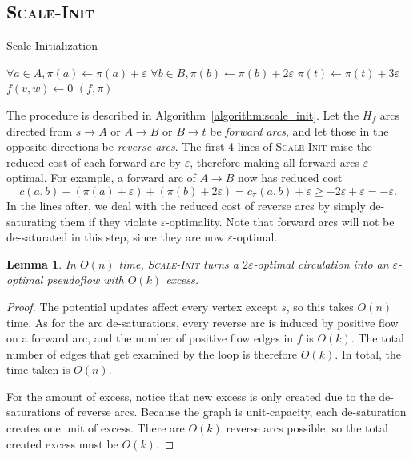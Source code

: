 \documentclass[11pt]{article}
\def\eps{\varepsilon}
\theoremstyle{plain}
\newtheorem{lemma}{Lemma}
\begin{document}
\subsection{\textsc{Scale-Init}}

\begin{algorithm}
\caption{Scale Initialization}
\label{algorithm:scale_init}
\begin{algorithmic}[1]
	\State $\forall a \in A, \pi(a) \gets \pi(a) + \eps$
	\State $\forall b \in B, \pi(b) \gets \pi(b) + 2\eps$
	\State $\pi(t) \gets \pi(t) + 3\eps$
	\Statex %
		\If{$c_\pi(w, v) < -\eps$}
			\State $f(v, w) \gets 0$
		\EndIf
	\EndFor
	\State\Return $(f, \pi)$
\EndFunction
\end{algorithmic}
\end{algorithm}

The procedure is described in Algorithm~\ref{algorithm:scale_init}.
Let the $H_f$ arcs directed from $s \to A$ or $A \to B$ or $B \to t$ be 
\emph{forward arcs}, and let those in the opposite directions be 
\emph{reverse arcs}.
The first 4 lines of \textsc{Scale-Init} raise the reduced cost of each
forward arc by $\eps$, therefore making all forward arcs $\eps$-optimal.
For example, a forward arc of $A \to B$ now has reduced cost
\begin{equation*}
	c(a, b) - (\pi(a) + \eps) + (\pi(b) + 2\eps) 
	= c_\pi(a, b) + \eps
	\geq -2\eps + \eps
	= -\eps.
\end{equation*}
In the lines after, we deal with the reduced cost of reverse arcs by simply
de-saturating them if they violate $\eps$-optimality.
Note that forward arcs will not be de-saturated in this step, since they are
now $\eps$-optimal.

\begin{lemma}
\label{lemma:scale_init}
	In $O(n)$ time, \textsc{Scale-Init} turns a $2\eps$-optimal circulation 
	into an $\eps$-optimal pseudoflow with $O(k)$ excess.
\end{lemma}
\begin{proof}
	The potential updates affect every vertex except $s$,
	so this takes $O(n)$ time.
	As for the arc de-saturations, every reverse arc is induced by positive 
	flow on a forward arc, and the number of positive flow edges in $f$ is 
	$O(k)$.
	The total number of edges that get examined by the loop is therefore 
	$O(k)$.
	In total, the time taken is $O(n)$.

	For the amount of excess, notice that new excess is only created due
	to the de-saturations of reverse arcs.
	Because the graph is unit-capacity, each de-saturation creates one unit 
	of excess.
	There are $O(k)$ reverse arcs possible, so the total created excess 
	must be $O(k)$.
\end{proof}
\end{document}
